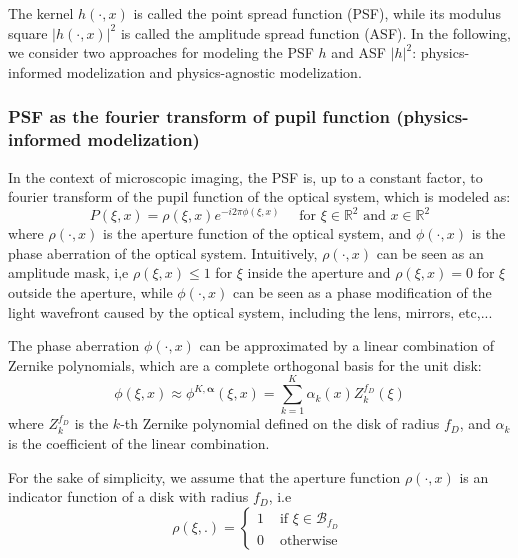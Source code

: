 \documentclass{article}
\begin{document}
The kernel $h(\cdot, x)$ is called the point spread function (PSF), while its modulus square $|h(\cdot, x)|^2$ is called the amplitude spread function (ASF).
In the following, we consider two approaches for modeling the PSF $h$ and ASF $|h|^2$: physics-informed modelization and physics-agnostic modelization.

\subsubsection{PSF as the fourier transform of pupil function (physics-informed modelization)}
In the context of microscopic imaging, the PSF is, up to a constant factor, to fourier transform of the pupil function of the optical system, which is modeled as:
\begin{equation}
    P(\xi, x) = \rho(\xi, x) e^{-i 2\pi \phi(\xi, x)} \quad \mbox{ for } \xi \in \mathbb{R}^2 \mbox{ and } x \in \mathbb{R}^2
\end{equation} 
where $\rho(\cdot, x)$ is the aperture function of the optical system, and $\phi(\cdot, x)$ is the phase aberration of the optical system. Intuitively, $\rho(\cdot, x)$ can be seen as an amplitude mask, i,e $\rho(\xi, x) \leq 1$ for $\xi$ inside the aperture and $\rho(\xi, x) = 0$ for $\xi$ outside the aperture, while $\phi(\cdot, x)$ can be seen as a phase modification of the light wavefront caused by the optical system, including the lens, mirrors, etc,... 

The phase aberration $\phi(\cdot, x)$ can be approximated by a linear combination of Zernike polynomials, which are a complete orthogonal basis for the unit disk:
\begin{equation}
    \phi(\xi, x)  \approx \phi^{K, \boldsymbol{\alpha}}(\xi, x) = \sum_{k=1}^{K} \alpha_k(x) Z_k^{f_D}(\xi) 
\end{equation}
where $Z_k^{f_D}$ is the $k$-th Zernike polynomial defined on the disk of radius $f_D$, and $\alpha_k$ is the coefficient of the linear combination.

For the sake of simplicity, we assume that the aperture function $\rho(\cdot, x)$ is an indicator function of a disk with radius $f_D$, i.e 
\begin{equation}
    \rho(\xi, .) = \begin{cases}
        1 & \mbox{ if } \xi \in \mathcal{B}_{f_D} \\
        0 & \mbox{ otherwise }
    \end{cases} 
\end{equation}
\end{document}
